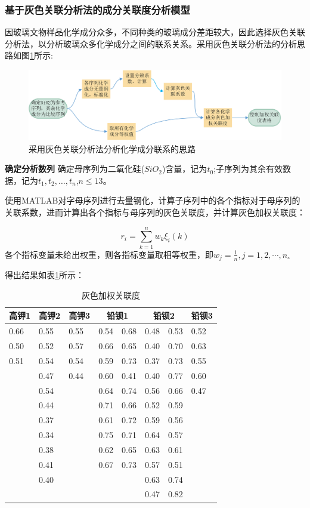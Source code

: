\documentclass{my_paper}
\begin{document}
\subsubsection{基于灰色关联分析法的成分关联度分析模型}
因玻璃文物样品化学成分众多，不同种类的玻璃成分差距较大，因此选择灰色关联分析法，以分析玻璃众多化学成分之间的联系关系。采用灰色关联分析法的分析思路如图\ref{灰色关联分析}所示:
\begin{figure}[H]
    \centering
    \includegraphics[width=1\textwidth]{灰色关联分析思路.jpg}
    \caption{采用灰色关联分析法分析化学成分联系的思路}
    \label{灰色关联分析}
\end{figure}
\textbf{确定分析数列}
确定母序列为二氧化硅($SiO_2$)含量，记为$t_0$;子序列为其余有效数据，记为$t_1,t_2,\dots,t_n$,$n\leq 13$。

使用MATLAB对字母序列进行去量钢化，计算子序列中的各个指标对于母序列的关联系数，进而计算出各个指标与母序列的灰色关联度，并计算灰色加权关联度：

   $$ r_{i}=\sum_{k=1}^{n} w_{k} \xi_{i}(k) $$
各个指标变量未给出权重，则各指标变量取相等权重，即$w_{j}=\frac{1}{n}, j=1,2, \cdots, n_{\circ}$

得出结果如表\ref{灰色关联度}所示：

\begin{table}[H]
    \centering
    \begin{tabular}{llllllll}
    \hline
        高钾1 & 高钾2 & 高钾3 &  \multicolumn{2}{c}{铅钡1}  & \multicolumn{2}{c}{铅钡2}   & 铅钡3 \\ \hline
        0.66 & 0.55 & 0.55 & 0.54 & 0.68 & 0.48 & 0.53 & 0.52 \\ 
        0.50 & 0.52 & 0.57 & 0.66 & 0.65 & 0.40 & 0.70 & 0.63 \\ 
        0.51 & 0.54 & 0.54 & 0.59 & 0.73 & 0.37 & 0.73 & 0.55 \\ 
        ~ & 0.47 & 0.44 & 0.60 & 0.41 & 0.40 & 0.77 & 0.60 \\ 
        ~ & 0.54 & ~ & 0.64 & 0.74 & 0.56 & 0.66 & 0.47 \\ 
        ~ & 0.44 & ~ & 0.71 & 0.66 & 0.52 & 0.59 & ~ \\ 
        ~ & 0.37 & ~ & 0.61 & 0.72 & 0.59 & 0.56 & ~ \\ 
        ~ & 0.34 & ~ & 0.75 & 0.71 & 0.64 & 0.57 & ~ \\ 
        ~ & 0.38 & ~ & 0.62 & 0.65 & 0.63 & 0.61 & ~ \\ 
        ~ & 0.41 & ~ & 0.67 & 0.73 & 0.57 & 0.51 & ~ \\ 
        ~ & 0.40 & ~ & ~ & ~ & 0.63 & 0.74 & ~ \\ 
        ~ & ~ & ~ & ~ & ~ & 0.47 & 0.82 \\ \hline
    \end{tabular}
    \caption{灰色加权关联度}
    \label{灰色关联度}
\end{table}
\end{document}

